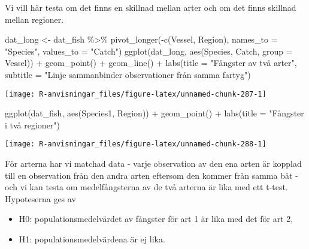 \documentclass[
]{book}
\newenvironment{Shaded}{\begin{snugshade}}{\end{snugshade}}
\newcommand{\AttributeTok}[1]{\textcolor[rgb]{0.77,0.63,0.00}{#1}}
\newcommand{\FunctionTok}[1]{\textcolor[rgb]{0.00,0.00,0.00}{#1}}
\newcommand{\NormalTok}[1]{#1}
\newcommand{\OtherTok}[1]{\textcolor[rgb]{0.56,0.35,0.01}{#1}}
\newcommand{\SpecialCharTok}[1]{\textcolor[rgb]{0.00,0.00,0.00}{#1}}
\newcommand{\StringTok}[1]{\textcolor[rgb]{0.31,0.60,0.02}{#1}}
\providecommand{\tightlist}{%
  \setlength{\itemsep}{0pt}\setlength{\parskip}{0pt}}
\theoremstyle{definition}
\theoremstyle{definition}
\theoremstyle{definition}
\theoremstyle{definition}
\theoremstyle{remark}
\begin{document}
Vi vill här testa om det finns en skillnad mellan arter och om det finns skillnad mellan regioner.

\begin{Shaded}
\begin{Highlighting}[]
\NormalTok{dat\_long }\OtherTok{\textless{}{-}}\NormalTok{ dat\_fish }\SpecialCharTok{\%\textgreater{}\%} 
  \FunctionTok{pivot\_longer}\NormalTok{(}\SpecialCharTok{{-}}\FunctionTok{c}\NormalTok{(Vessel, Region), }\AttributeTok{names\_to =} \StringTok{"Species"}\NormalTok{, }\AttributeTok{values\_to =} \StringTok{"Catch"}\NormalTok{)}
\FunctionTok{ggplot}\NormalTok{(dat\_long, }\FunctionTok{aes}\NormalTok{(Species, Catch, }\AttributeTok{group =}\NormalTok{ Vessel)) }\SpecialCharTok{+} 
  \FunctionTok{geom\_point}\NormalTok{() }\SpecialCharTok{+} 
  \FunctionTok{geom\_line}\NormalTok{() }\SpecialCharTok{+}
  \FunctionTok{labs}\NormalTok{(}\AttributeTok{title =} \StringTok{"Fångster av två arter"}\NormalTok{, }\AttributeTok{subtitle =} \StringTok{"Linje sammanbinder observationer från samma fartyg"}\NormalTok{)}
\end{Highlighting}
\end{Shaded}

\begin{center}\texttt{[image: R-anvisningar\_files/figure-latex/unnamed-chunk-287-1]} \end{center}

\begin{Shaded}
\begin{Highlighting}[]
\FunctionTok{ggplot}\NormalTok{(dat\_fish, }\FunctionTok{aes}\NormalTok{(Species1, Region)) }\SpecialCharTok{+} 
  \FunctionTok{geom\_point}\NormalTok{() }\SpecialCharTok{+}
  \FunctionTok{labs}\NormalTok{(}\AttributeTok{title =} \StringTok{"Fångster i två regioner"}\NormalTok{)}
\end{Highlighting}
\end{Shaded}

\begin{center}\texttt{[image: R-anvisningar\_files/figure-latex/unnamed-chunk-288-1]} \end{center}

För arterna har vi matchad data - varje observation av den ena arten är kopplad till en observation från den andra arten eftersom den kommer från samma båt - och vi kan testa om medelfångsterna av de två arterna är lika med ett t-test. Hypoteserna ges av

\begin{itemize}
\tightlist
\item
  H0: populationsmedelvärdet av fångster för art 1 är lika med det för art 2,
\item
  H1: populationsmedelvärdena är ej lika.
\end{itemize}
\end{document}
